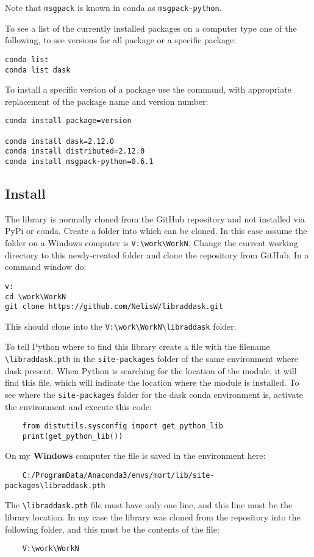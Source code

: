 Note that \lstinline{msgpack} is known in conda as \lstinline{msgpack-python}.

To see a list of the currently installed packages on a computer type one of the following, to see versions for all package or a specific package:
\begin{lstlisting}
conda list
conda list dask
\end{lstlisting}

To install a specific version of a package use the command, with appropriate replacement of the package name and version number:
\begin{lstlisting}
conda install package=version

conda install dask=2.12.0
conda install distributed=2.12.0
conda install msgpack-python=0.6.1
\end{lstlisting}


\subsection{Install \libraddask{}}
\label{sec:Installlibraddask}

The \libraddask{} library is normally cloned from the GitHub repository and not installed via PyPi or conda. 
Create a folder into which \libraddask{} can be cloned. In this case assume the folder on a Windows computer is \lstinline{V:\work\WorkN}.  Change the current working directory to this newly-created folder and clone the \libraddask{}  repository from GitHub. In a command window do:
\begin{lstlisting}
v:
cd \work\WorkN
git clone https://github.com/NelisW/libraddask.git
\end{lstlisting}
This should clone \libraddask{}  into the \lstinline{V:\work\WorkN\libraddask} folder.

To tell Python where to find this library create a file with the filename \lstinline{\libraddask.pth} in the \lstinline{site-packages} folder of the same environment where dask present. When Python is searching for the location of the \libraddask{} module, it will find this file, which will indicate the location where the module is installed.
To see where the \lstinline{site-packages} folder for the dask conda environment is,  activate the environment and execute this code:
\begin{lstlisting}
    from distutils.sysconfig import get_python_lib
    print(get_python_lib())
\end{lstlisting}

On my\textbf{ Windows} computer the file is saved in the environment here: 
\begin{lstlisting}
    C:/ProgramData/Anaconda3/envs/mort/lib/site-packages\libraddask.pth
\end{lstlisting}
The \lstinline{\libraddask.pth} file must have only one line, and this line must be the \libraddask{}  library location.    In my case the library was cloned from the repository into the following folder, and this must be the contents of the file:
\begin{lstlisting}
    V:\work\WorkN
\end{lstlisting}

